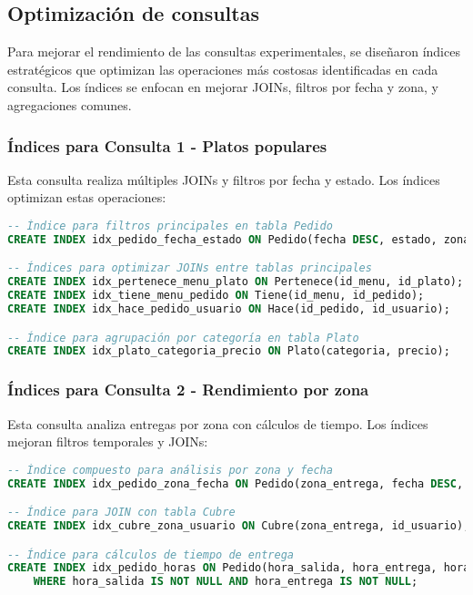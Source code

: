 \documentclass[12pt,a4paper]{article}
\begin{document}
\subsection{Optimización de consultas}

Para mejorar el rendimiento de las consultas experimentales, se diseñaron índices estratégicos que optimizan las operaciones más costosas identificadas en cada consulta. Los índices se enfocan en mejorar JOINs, filtros por fecha y zona, y agregaciones comunes.

\subsubsection{Índices para Consulta 1 - Platos populares}
Esta consulta realiza múltiples JOINs y filtros por fecha y estado. Los índices optimizan estas operaciones:

\begin{lstlisting}[language=SQL]
-- Índice para filtros principales en tabla Pedido
CREATE INDEX idx_pedido_fecha_estado ON Pedido(fecha DESC, estado, zona_entrega);

-- Índices para optimizar JOINs entre tablas principales
CREATE INDEX idx_pertenece_menu_plato ON Pertenece(id_menu, id_plato);
CREATE INDEX idx_tiene_menu_pedido ON Tiene(id_menu, id_pedido);
CREATE INDEX idx_hace_pedido_usuario ON Hace(id_pedido, id_usuario);

-- Índice para agrupación por categoría en tabla Plato
CREATE INDEX idx_plato_categoria_precio ON Plato(categoria, precio);
\end{lstlisting}

\subsubsection{Índices para Consulta 2 - Rendimiento por zona}
Esta consulta analiza entregas por zona con cálculos de tiempo. Los índices mejoran filtros temporales y JOINs:

\begin{lstlisting}[language=SQL]
-- Índice compuesto para análisis por zona y fecha
CREATE INDEX idx_pedido_zona_fecha ON Pedido(zona_entrega, fecha DESC, estado);

-- Índice para JOIN con tabla Cubre
CREATE INDEX idx_cubre_zona_usuario ON Cubre(zona_entrega, id_usuario);

-- Índice para cálculos de tiempo de entrega
CREATE INDEX idx_pedido_horas ON Pedido(hora_salida, hora_entrega, hora_entrega_estimada)
    WHERE hora_salida IS NOT NULL AND hora_entrega IS NOT NULL;
\end{lstlisting}
\end{document}
